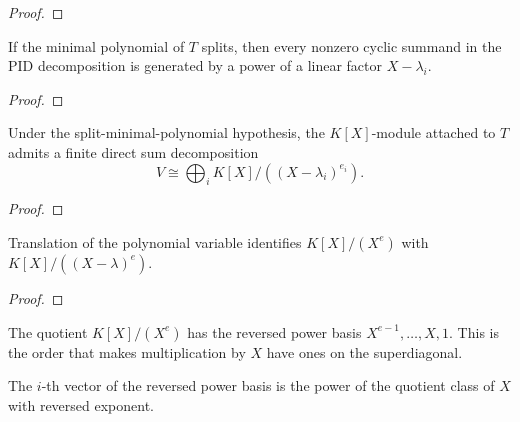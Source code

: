 \begin{proof}
  \leanok
\end{proof}

\begin{theorem}
  \label{thm:pid_summand_linear}
  \leanok
  If the minimal polynomial of \(T\) splits, then every nonzero cyclic summand
  in the PID decomposition is generated by a power of a linear factor
  \(X-\lambda_i\).
\end{theorem}

\begin{proof}
  \leanok
\end{proof}

\begin{theorem}
  \label{thm:pid_linear_cyclic_decomposition}
  \leanok
  Under the split-minimal-polynomial hypothesis, the \(K[X]\)-module attached
  to \(T\) admits a finite direct sum decomposition
  \[
    V \cong \bigoplus_i K[X]/((X-\lambda_i)^{e_i}).
  \]
\end{theorem}

\begin{proof}
  \leanok
\end{proof}

\begin{theorem}
  \label{thm:quotient_translation}
  \leanok
  Translation of the polynomial variable identifies \(K[X]/(X^e)\) with
  \(K[X]/((X-\lambda)^e)\).
\end{theorem}

\begin{proof}
  \leanok
\end{proof}

\begin{definition}
  \label{def:reverse_power_basis}
  \leanok
  The quotient \(K[X]/(X^e)\) has the reversed power basis
  \(X^{e-1},\ldots,X,1\).  This is the order that makes multiplication by
  \(X\) have ones on the superdiagonal.
\end{definition}

\begin{theorem}
  \label{thm:reverse_power_basis_apply}
  \leanok
  The \(i\)-th vector of the reversed power basis is the power of the quotient
  class of \(X\) with reversed exponent.
\end{theorem}

